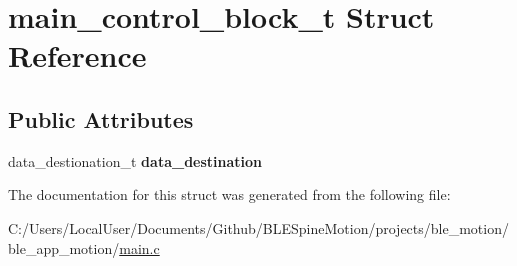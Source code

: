 \hypertarget{structmain__control__block__t}{}\section{main\+\_\+control\+\_\+block\+\_\+t Struct Reference}
\label{structmain__control__block__t}
\subsection*{Public Attributes}
\begin{DoxyCompactItemize}
\item 
\mbox{\label{structmain__control__block__t_a8c8fda2ece159aa33838781cd2fbf78c}} 
data\+\_\+destionation\+\_\+t {\bfseries data\+\_\+destination}
\end{DoxyCompactItemize}


The documentation for this struct was generated from the following file\+:\begin{DoxyCompactItemize}
\item 
C\+:/\+Users/\+Local\+User/\+Documents/\+Github/\+B\+L\+E\+Spine\+Motion/projects/ble\+\_\+motion/ble\+\_\+app\+\_\+motion/\mbox{\hyperlink{main_8c}{main.\+c}}\end{DoxyCompactItemize}
